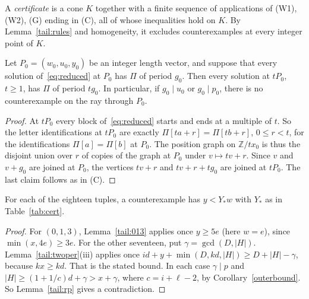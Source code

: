 A \emph{certificate} is a cone \(K\) together with a finite sequence of applications of (W1), (W2), (G) ending in (C), all of whose inequalities hold on \(K\). By Lemma~\ref{tail:rules} and homogeneity, it excludes counterexamples at every integer point of \(K\).

\begin{lemma}[Dilation]\label{tail:dilation}
Let \(P_0=(w_0,u_0,y_0)\) be an integer length vector, and suppose that every solution of~\eqref{eq:reduced} at \(P_0\) has \(\Pi\) of period \(g_0\). Then every solution at \(tP_0\), \(t\ge1\), has \(\Pi\) of period \(tg_0\). In particular, if \(g_0\mid u_0\) or \(g_0\mid p_0\), there is no counterexample on the ray through \(P_0\).
\end{lemma}
\begin{proof}
At \(tP_0\) every block of~\eqref{eq:reduced} starts and ends at a multiple of \(t\). So the letter identifications at \(tP_0\) are exactly \(\Pi[ta+r]=\Pi[tb+r]\), \(0\le r<t\), for the identifications \(\Pi[a]=\Pi[b]\) at \(P_0\). The position graph on \(\mathbb Z/tx_0\) is thus the disjoint union over \(r\) of copies of the graph at \(P_0\) under \(v\mapsto tv+r\). Since \(v\) and \(v+g_0\) are joined at \(P_0\), the vertices \(tv+r\) and \(tv+r+tg_0\) are joined at \(tP_0\). The last claim follows as in (C).
\end{proof}

\begin{lemma}[Long \(Y\)]\label{tail:longY}
For each of the eighteen tuples, a counterexample has \(y<Y_*w\) with \(Y_*\) as in Table~\ref{tab:cert}.
\end{lemma}
\begin{proof}
For \((0,1,3)\), Lemma~\ref{tail:013} applies once \(y\ge5e\) (here \(w=e\)), since \(\min(x,4e)\ge3e\). For the other seventeen, put \(\gamma=\gcd(D,|H|)\). Lemma~\ref{tail:twoper}(iii) applies once \(id+y+\min(D,kd,|H|)\ge D+|H|-\gamma\), because \(kx\ge kd\). That is the stated bound. In each case \(\gamma\mid p\) and \(|H|\ge(1+1/c)d+\gamma>x+\gamma\), where \(c=i+\ell-2\), by Corollary~\ref{outerbound}. So Lemma~\ref{tail:rp} gives a contradiction.
\end{proof}

